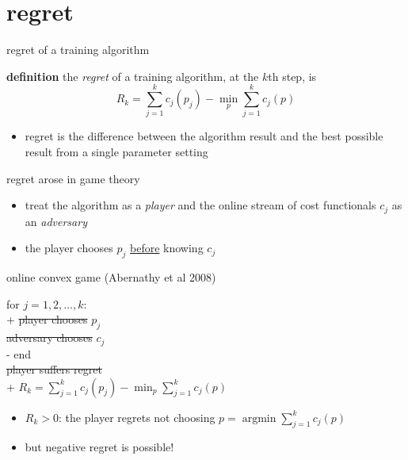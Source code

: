 \documentclass[xcolor={svgnames},
               hyperref={colorlinks,citecolor=DeepPink4,linkcolor=FireBrick,urlcolor=Maroon}]
               {beamer}
\newcommand{\ds}{\displaystyle}
\begin{document}
\section{regret}

\begin{frame}{regret of a training algorithm}

\begin{block}{\textbf{definition}}
the \emph{regret} of a training algorithm, at the $k$th step, is
    $$R_k = \sum_{j=1}^k c_j(p_j) - \min_p \sum_{j=1}^k c_j(p)$$
\end{block}

\begin{itemize}
\item regret is the difference between the algorithm result and the best possible result from a single parameter setting
\end{itemize}
\end{frame}


\begin{frame}{regret arose in game theory}

\begin{itemize}
\item treat the algorithm as a \emph{player} and the online stream of cost functionals $c_j$ as an \emph{adversary}
\item the player chooses $p_j$ \underline{before} knowing $c_j$
\end{itemize}

\begin{block}{online convex game (Abernathy et al 2008)}
\begin{pseudo*}
for $j = 1,2,\dots,k$: \\+
    \st{player chooses} $p_{j}$ \\
    \st{adversary chooses} $c_{j}$ \\-
end \\
\st{player suffers regret} \\+
    $\ds R_k = \sum_{j=1}^k c_j(p_j) - \min_p \sum_{j=1}^k c_j(p)$
\end{pseudo*}
\end{block}

\begin{itemize}
\item $R_k>0$: the player regrets not choosing $p = \operatorname{argmin} \sum_{j=1}^k c_j(p)$
\item but negative regret is possible!
\end{itemize}
\end{frame}
\end{document}
